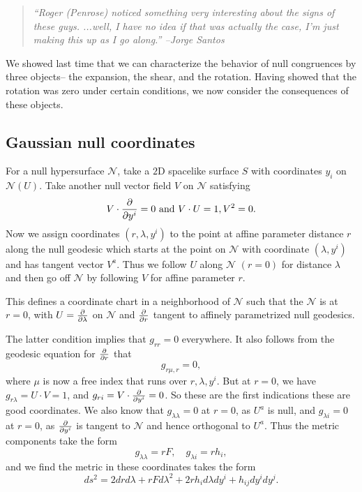 \begin{quote}
    \textit{``Roger (Penrose) noticed something very interesting about the signs of these guys. ...well, I have no idea if that was actually the case, I'm just making this up as I go along.'' --Jorge Santos}
\end{quote}
We showed last time that we can characterize the behavior of null congruences by three objects-- the expansion, the shear, and the rotation. Having showed that the rotation was zero under certain conditions, we now consider the consequences of these objects.

\subsection*{Gaussian null coordinates} For a null hypersurface $\mathcal{N}$, take a $2$D spacelike surface $S$ with coordinates $y_i$ on $\mathcal{N}(U)$. Take another null vector field $V$ on $\mathcal{N}$ satisfying \begin{equation}
    V\cdot \P{}{y^i}=0\text{ and } V\cdot U=1, V^2=0.
\end{equation}
Now we assign coordinates $(r,\lambda,y^i)$ to the point at affine parameter distance $r$ along the null geodesic which starts at the point on $\mathcal{N}$ with coordinate $(\lambda,y^i)$ and has tangent vector $V^a$. Thus we follow $U$ along $\mathcal{N}$ $(r=0)$ for distance $\lambda$ and then go off $\mathcal{N}$ by following $V$ for affine parameter $r$.

This defines a coordinate chart in a neighborhood of $\mathcal{N}$ such that the $\mathcal{N}$ is at $r=0$, with $U=\P{}{\lambda}$ on $\mathcal{N}$ and $\P{}{r}$ tangent to affinely parametrized null geodesics.

The latter condition implies that $g_{rr}=0$ everywhere. It also follows from the geodesic equation for $\P{}{r}$ that
\begin{equation}
    g_{r\mu,r}=0,
\end{equation}
where $\mu$ is now a free index that runs over $r,\lambda,y^i$.
But at $r=0$, we have $g_{r\lambda}=U\cdot V = 1$, and $g_{ri}=V\cdot \P{}{y^i}=0$.
So these are the first indications these are good coordinates. We also know that $g_{\lambda\lambda}=0$ at $r=0$, as $U^a$ is null, and $g_{\lambda i}=0$ at $r=0$, as $\P{}{y^i}$ is tangent to $\mathcal{N}$ and hence orthogonal to $U^a$. Thus the metric components take the form
\begin{equation}
    g_{\lambda\lambda}= rF, \quad g_{\lambda i} = r h_i,
\end{equation}
and we find the metric in these coordinates takes the form
\begin{equation}
    ds^2 = 2drd\lambda +rF d\lambda^2 +2rh_i d\lambda dy^i + h_{ij} dy^i dy^j.
\end{equation}

